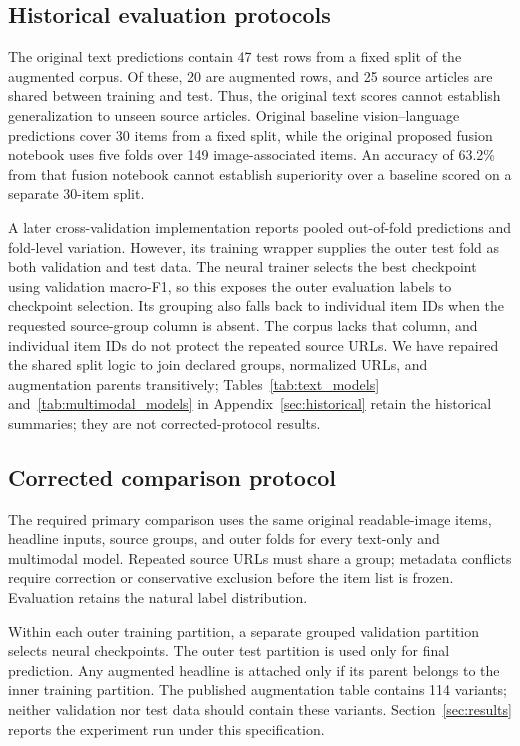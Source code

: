 \documentclass[11pt]{article}
\begin{document}
\subsection{Historical evaluation protocols}
The original text predictions contain 47 test rows from a fixed split of the augmented corpus. Of these, 20 are augmented rows, and 25 source articles are shared between training and test. Thus, the original text scores cannot establish generalization to unseen source articles. Original baseline vision--language predictions cover 30 items from a fixed split, while the original proposed fusion notebook uses five folds over 149 image-associated items. An accuracy of 63.2\% from that fusion notebook cannot establish superiority over a baseline scored on a separate 30-item split.

A later cross-validation implementation reports pooled out-of-fold predictions and fold-level variation. However, its training wrapper supplies the outer test fold as both validation and test data. The neural trainer selects the best checkpoint using validation macro-F1, so this exposes the outer evaluation labels to checkpoint selection. Its grouping also falls back to individual item IDs when the requested source-group column is absent. The corpus lacks that column, and individual item IDs do not protect the repeated source URLs. We have repaired the shared split logic to join declared groups, normalized URLs, and augmentation parents transitively; Tables~\ref{tab:text_models} and~\ref{tab:multimodal_models} in Appendix~\ref{sec:historical} retain the historical summaries; they are not corrected-protocol results.

\subsection{Corrected comparison protocol}\label{sec:experimental_setup}
The required primary comparison uses the same original readable-image items, headline inputs, source groups, and outer folds for every text-only and multimodal model. Repeated source URLs must share a group; metadata conflicts require correction or conservative exclusion before the item list is frozen. Evaluation retains the natural label distribution.

Within each outer training partition, a separate grouped validation partition selects neural checkpoints. The outer test partition is used only for final prediction. Any augmented headline is attached only if its parent belongs to the inner training partition. The published augmentation table contains 114 variants; neither validation nor test data should contain these variants. Section~\ref{sec:results} reports the experiment run under this specification.
\end{document}

